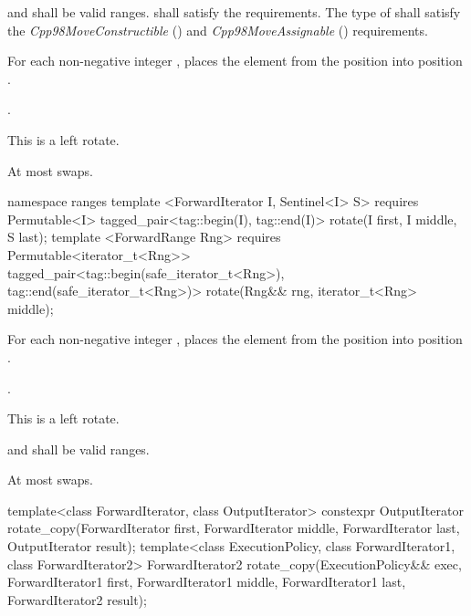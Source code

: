\begin{itemdescr}
\pnum
\requires
{}
and
shall be valid ranges.
 shall satisfy the
 requirements. The type of  shall satisfy
the \textit{Cpp98MoveConstructible} () and
\textit{Cpp98MoveAssignable} () requirements.

\pnum
\effects
For each non-negative integer
,
places the element from the position
into position
.

\pnum
\returns {}.

\pnum
\remarks
This is a left rotate.

\pnum
\complexity
At most
swaps.
\end{itemdescr}

\begin{addedblock}
%
\begin{itemdecl}
namespace ranges {
  template <ForwardIterator I, Sentinel<I> S>
      requires Permutable<I>
    tagged_pair<tag::begin(I), tag::end(I)> rotate(I first, I middle, S last);
  template <ForwardRange Rng>
      requires Permutable<iterator_t<Rng>>
    tagged_pair<tag::begin(safe_iterator_t<Rng>), tag::end(safe_iterator_t<Rng>)>
      rotate(Rng&& rng, iterator_t<Rng> middle);
}
\end{itemdecl}

\begin{itemdescr}
\pnum
\effects
For each non-negative integer
,
places the element from the position
into position
.

\pnum
\returns {}.

\pnum
\remarks
This is a left rotate.

\pnum
\requires
{}
and
shall be valid ranges.

\pnum
\complexity
At most
swaps.
\end{itemdescr}
\end{addedblock}

%
\begin{itemdecl}
template<class ForwardIterator, class OutputIterator>
  constexpr OutputIterator
    rotate_copy(ForwardIterator first, ForwardIterator middle, ForwardIterator last,
                OutputIterator result);
template<class ExecutionPolicy, class ForwardIterator1, class ForwardIterator2>
  ForwardIterator2
    rotate_copy(ExecutionPolicy&& exec,
                ForwardIterator1 first, ForwardIterator1 middle, ForwardIterator1 last,
                ForwardIterator2 result);
\end{itemdecl}

